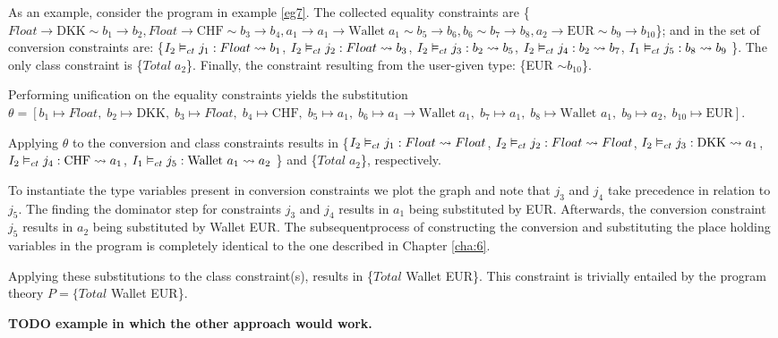 As an example, consider the program in example \ref{eg7}. The collected equality constraints are \{$Float \to \text{DKK} \sim b_1 \to b_2, Float \to \text{CHF} \sim b_3 \to b_4,a_1 \to a_1 \to \text{Wallet} \; a_1 \sim b_5 \to b_6, b_6 \sim b_7 \to b_8, a_2 \to \text{EUR} \sim b_9 \to b_{10}$\}; and in the set of conversion constraints are: \{${I_2} \vDash_{ct} {j_1}: {Float} \rightsquigarrow {b_1}$, ${I_2} \vDash_{ct} {j_2}: {Float} \rightsquigarrow {b_3}$, ${I_2} \vDash_{ct} {j_3}: {b_2} \rightsquigarrow {b_5}$, ${I_2} \vDash_{ct} {j_4}: {b_2} \rightsquigarrow {b_7}$, ${I_1} \vDash_{ct} {j_5}: {b_8} \rightsquigarrow {b_9}$ \}. The only class constraint is \{$Total\;a_2$\}. Finally, the constraint resulting from the user-given type: \{EUR $\sim b_{10}$\}.

Performing unification on the equality constraints yields the substitution $\theta = [b_1 \mapsto Float, \;b_2 \mapsto \text{DKK}, \;b_3 \mapsto Float, \;b_4 \mapsto \text{CHF}, \;b_5 \mapsto a_1, \;b_6 \mapsto a_1 \to \text{Wallet}\;a_1, \;b_7 \mapsto a_1, \;b_8 \mapsto \text{Wallet }a_1, \;b_9 \mapsto a_2, \;b_{10} \mapsto \text{EUR}]$.

Applying $\theta$ to the conversion and class constraints results in \{${I_2} \vDash_{ct} {j_1}: {Float} \rightsquigarrow {Float}$, ${I_2} \vDash_{ct} {j_2}: {Float} \rightsquigarrow {Float}$, ${I_2} \vDash_{ct} {j_3}: {\text{DKK}} \rightsquigarrow {a_1}$, ${I_2} \vDash_{ct} {j_4}: {\text{CHF}} \rightsquigarrow {a_1}$, ${I_1} \vDash_{ct} {j_5}: {\text{Wallet }a_1} \rightsquigarrow {a_2}$ \} and \{$Total\;a_2$\}, respectively.

To instantiate the type variables present in conversion constraints we plot the graph and note that $j_3$ and $j_4$ take precedence in relation to $j_5$. The finding the dominator step for constraints $j_3$ and $j_4$ results in $a_1$ being substituted by EUR. Afterwards, the conversion constraint $j_5$ results in $a_2$ being substituted by Wallet EUR. The subsequentprocess of constructing the conversion and substituting the place holding variables in the program is completely identical to the one described in Chapter \ref{cha:6}.

Applying these substitutions to the class constraint(s), results in \{$Total$ Wallet EUR\}. This constraint is trivially entailed by the program theory $P = \{Total$ Wallet EUR\}.

\textbf{TODO example in which the other approach would work.}

